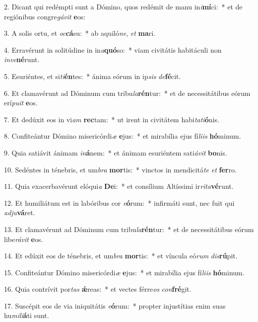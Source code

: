 2. Dicant qui redémpti sunt a Dómino, quos redémit de manu in\textit{i}\textbf{mí}ci:~*  et de regiónibus congre\textit{gá}\textit{vit} \textbf{e}os:\

3. A solis ortu, et \textit{oc}\textbf{cá}su:~*  ab aquiló\textit{ne}, \textit{et} \textbf{ma}ri.\

4. Erravérunt in solitúdine in in\textit{a}\textbf{quó}so:~*  viam civitátis habitáculi non \textit{in}\textit{ve}\textbf{né}runt.\

5. Esuriéntes, et si\textit{ti}\textbf{én}tes:~*  ánima eórum in ip\textit{sis} \textit{de}\textbf{fé}cit.\

6. Et clamavérunt ad Dóminum cum tribu\textit{la}\textbf{rén}tur:~*  et de necessitátibus eórum erí\textit{pu}\textit{it} \textbf{e}os.\

7. Et dedúxit eos in vi\textit{am} \textbf{rec}tam:~*  ut irent in civitátem habi\textit{ta}\textit{ti}\textbf{ó}nis.\

8. Confiteántur Dómino misericórdi\textit{æ} \textbf{e}jus:~*  et mirabília ejus fí\textit{li}\textit{is} \textbf{hó}minum.\

9. Quia satiávit ánimam \textit{in}\textbf{á}nem:~*  et ánimam esuriéntem sati\textit{á}\textit{vit} \textbf{bo}nis.\

10. Sedéntes in ténebris, et um\textit{bra} \textbf{mor}tis:~*  vinctos in mendicitá\textit{te} \textit{et} \textbf{fer}ro.\

11. Quia exacerbavérunt elóqui\textit{a} \textbf{De}i:~*  et consílium Altíssimi ir\textit{ri}\textit{ta}\textbf{vé}runt.\

12. Et humiliátum est in labóribus cor \textit{e}\textbf{ó}rum:~*  infirmáti sunt, nec fuit qui \textit{ad}\textit{ju}\textbf{vá}ret.\

13. Et clamavérunt ad Dóminum cum tribu\textit{la}\textbf{rén}tur:~*  et de necessitátibus eórum libe\textit{rá}\textit{vit} \textbf{e}os.\

14. Et edúxit eos de ténebris, et um\textit{bra} \textbf{mor}tis:~*  et víncula eó\textit{rum} \textit{dis}\textbf{rú}pit.\

15. Confiteántur Dómino misericórdi\textit{æ} \textbf{e}jus:~*  et mirabília ejus fí\textit{li}\textit{is} \textbf{hó}minum.\

16. Quia contrívit por\textit{tas} \textbf{ǽ}reas:~*  et vectes férre\textit{os} \textit{con}\textbf{fré}git.\

17. Suscépit eos de via iniquitátis \textit{e}\textbf{ó}rum:~*  propter injustítias enim suas hu\textit{mi}\textit{li}\textbf{á}ti sunt.\

